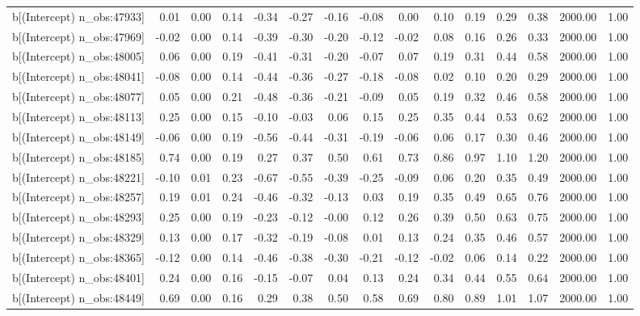 \begin{table}[ht]
\begin{tabular}{rrrrrrrrrrrrrrr}
  b[(Intercept) n\_obs:47933] & 0.01 & 0.00 & 0.14 & -0.34 & -0.27 & -0.16 & -0.08 & 0.00 & 0.10 & 0.19 & 0.29 & 0.38 & 2000.00 & 1.00 \\ 
  b[(Intercept) n\_obs:47969] & -0.02 & 0.00 & 0.14 & -0.39 & -0.30 & -0.20 & -0.12 & -0.02 & 0.08 & 0.16 & 0.26 & 0.33 & 2000.00 & 1.00 \\ 
  b[(Intercept) n\_obs:48005] & 0.06 & 0.00 & 0.19 & -0.41 & -0.31 & -0.20 & -0.07 & 0.07 & 0.19 & 0.31 & 0.44 & 0.58 & 2000.00 & 1.00 \\ 
  b[(Intercept) n\_obs:48041] & -0.08 & 0.00 & 0.14 & -0.44 & -0.36 & -0.27 & -0.18 & -0.08 & 0.02 & 0.10 & 0.20 & 0.29 & 2000.00 & 1.00 \\ 
  b[(Intercept) n\_obs:48077] & 0.05 & 0.00 & 0.21 & -0.48 & -0.36 & -0.21 & -0.09 & 0.05 & 0.19 & 0.32 & 0.46 & 0.58 & 2000.00 & 1.00 \\ 
  b[(Intercept) n\_obs:48113] & 0.25 & 0.00 & 0.15 & -0.10 & -0.03 & 0.06 & 0.15 & 0.25 & 0.35 & 0.44 & 0.53 & 0.62 & 2000.00 & 1.00 \\ 
  b[(Intercept) n\_obs:48149] & -0.06 & 0.00 & 0.19 & -0.56 & -0.44 & -0.31 & -0.19 & -0.06 & 0.06 & 0.17 & 0.30 & 0.46 & 2000.00 & 1.00 \\ 
  b[(Intercept) n\_obs:48185] & 0.74 & 0.00 & 0.19 & 0.27 & 0.37 & 0.50 & 0.61 & 0.73 & 0.86 & 0.97 & 1.10 & 1.20 & 2000.00 & 1.00 \\ 
  b[(Intercept) n\_obs:48221] & -0.10 & 0.01 & 0.23 & -0.67 & -0.55 & -0.39 & -0.25 & -0.09 & 0.06 & 0.20 & 0.35 & 0.49 & 2000.00 & 1.00 \\ 
  b[(Intercept) n\_obs:48257] & 0.19 & 0.01 & 0.24 & -0.46 & -0.32 & -0.13 & 0.03 & 0.19 & 0.35 & 0.49 & 0.65 & 0.76 & 2000.00 & 1.00 \\ 
  b[(Intercept) n\_obs:48293] & 0.25 & 0.00 & 0.19 & -0.23 & -0.12 & -0.00 & 0.12 & 0.26 & 0.39 & 0.50 & 0.63 & 0.75 & 2000.00 & 1.00 \\ 
  b[(Intercept) n\_obs:48329] & 0.13 & 0.00 & 0.17 & -0.32 & -0.19 & -0.08 & 0.01 & 0.13 & 0.24 & 0.35 & 0.46 & 0.57 & 2000.00 & 1.00 \\ 
  b[(Intercept) n\_obs:48365] & -0.12 & 0.00 & 0.14 & -0.46 & -0.38 & -0.30 & -0.21 & -0.12 & -0.02 & 0.06 & 0.14 & 0.22 & 2000.00 & 1.00 \\ 
  b[(Intercept) n\_obs:48401] & 0.24 & 0.00 & 0.16 & -0.15 & -0.07 & 0.04 & 0.13 & 0.24 & 0.34 & 0.44 & 0.55 & 0.64 & 2000.00 & 1.00 \\ 
  b[(Intercept) n\_obs:48449] & 0.69 & 0.00 & 0.16 & 0.29 & 0.38 & 0.50 & 0.58 & 0.69 & 0.80 & 0.89 & 1.01 & 1.07 & 2000.00 & 1.00 \\ 

\end{tabular}
\end{table}
